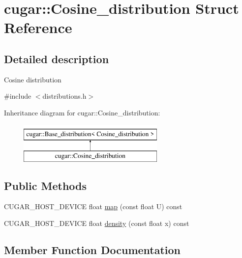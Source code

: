 \hypertarget{structcugar_1_1_cosine__distribution}{}\section{cugar\+:\+:Cosine\+\_\+distribution Struct Reference}
\label{structcugar_1_1_cosine__distribution}


\subsection{Detailed description}
Cosine distribution 

{\ttfamily \#include $<$distributions.\+h$>$}

Inheritance diagram for cugar\+:\+:Cosine\+\_\+distribution\+:\begin{figure}[H]
\begin{center}
\leavevmode
\includegraphics[height=2.000000cm]{structcugar_1_1_cosine__distribution}
\end{center}
\end{figure}
\subsection*{Public Methods}
\begin{DoxyCompactItemize}
\item 
C\+U\+G\+A\+R\+\_\+\+H\+O\+S\+T\+\_\+\+D\+E\+V\+I\+CE float \hyperlink{structcugar_1_1_cosine__distribution_a0440bb1dc47d5d8593fe568ae2b40cd9}{map} (const float U) const
\item 
C\+U\+G\+A\+R\+\_\+\+H\+O\+S\+T\+\_\+\+D\+E\+V\+I\+CE float \hyperlink{structcugar_1_1_cosine__distribution_ad6c1c1232187832f55e1690c60be8ae7}{density} (const float x) const
\end{DoxyCompactItemize}


\subsection{Member Function Documentation}
\mbox{\label{structcugar_1_1_cosine__distribution_ad6c1c1232187832f55e1690c60be8ae7}} 
